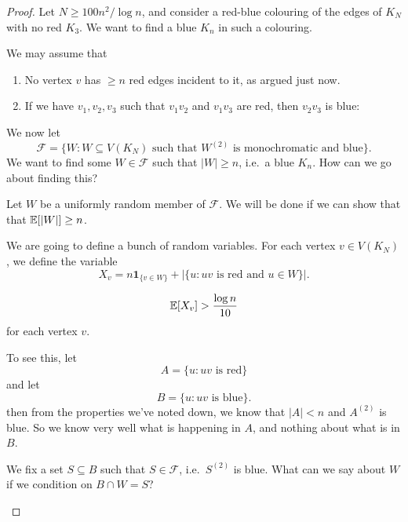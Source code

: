 \documentclass[a4paper]{article}
\begin{document}
\begin{proof}
  Let $N \geq 100n^2/\log n$, and consider a red-blue colouring of the edges of $K_N$ with no red $K_3$. We want to find a blue $K_n$ in such a colouring.

  We may assume that
  \begin{enumerate}
  \item No vertex $v$ has $ \geq n$ red edges incident to it, as argued just now.
  \item If we have $v_1, v_2, v_3$ such that $v_1v_2$ and $v_1 v_3$ are red, then $v_2 v_3$ is blue:
    \begin{center}
    \end{center}
  \end{enumerate}
  We now let
  \[
    \mathcal{F} = \{W : W \subseteq V(K_N)\text{ such that }W^{(2)} \text{ is monochromatic and blue}\}.
  \]
  We want to find some $W \in \mathcal{F}$ such that $|W| \geq n$, i.e.\ a blue $K_n$. How can we go about finding this?

  Let $W$ be a uniformly random member of $\mathcal{F}$. We will be done if we can show that that $\mathbb{E}[|W|] \geq n$.

  We are going to define a bunch of random variables. For each vertex $v \in V(K_N)$, we define the variable
  \[
    X_v = n \mathbf{1}_{\{v \in W\}} + |\{u: uv\text{ is red and }u \in W\}|.
  \]
  \begin{claim}
    \[
      \mathbb{E}[X_v] > \frac{\log n}{10}
    \]
    for each vertex $v$.
  \end{claim}
  To see this, let
  \[
    A = \{u: uv \text{ is red}\}
  \]
  and let
  \[
    B = \{u: uv \text{ is blue}\}.
  \]
  then from the properties we've noted down, we know that $|A| < n$ and $A^{(2)}$ is blue. So we know very well what is happening in $A$, and nothing about what is in $B$.

  We fix a set $S \subseteq B$ such that $S \in \mathcal{F}$, i.e.\ $S^{(2)}$ is blue. What can we say about $W$ if we condition on $B \cap W = S$?
  \begin{center}
\end{center}
\end{proof}
\end{document}
